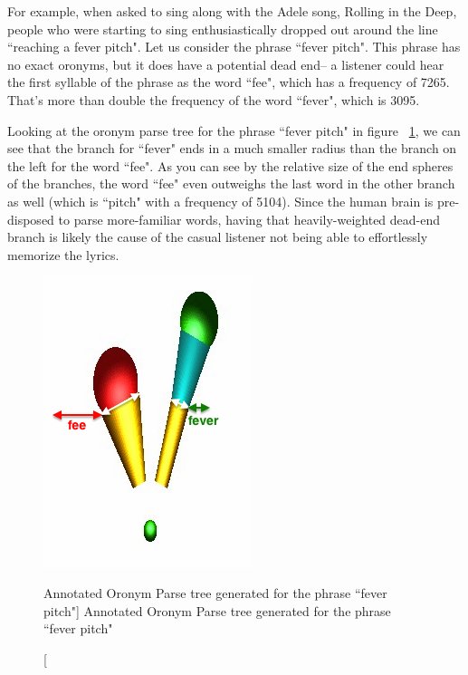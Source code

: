 For example, when asked to sing along with the Adele song, Rolling in the Deep, people who were starting to sing enthusiastically dropped out around the line ``reaching a fever pitch"\cite{frontPorchBandAdeleCover}.  Let us consider the phrase ``fever pitch".  This phrase has no exact oronyms, but it does have a potential dead end-- a listener could hear the first syllable of the phrase as the word ``fee", which has a frequency of 7265.  That's more than double the frequency of the word ``fever", which is 3095.  

Looking at the oronym parse tree for the phrase ``fever pitch" in figure ~\ref{fig:feverPitchOronymTree}, we can see that the branch for ``fever" ends in a much smaller radius than the branch on the left for the word ``fee".  As you can see by the relative size of the end spheres of the branches, the word ``fee" even outweighs the last word in the other branch as well (which is ``pitch" with a frequency of 5104). Since the human brain is pre-disposed to parse more-familiar words, having that heavily-weighted dead-end branch is likely the cause of the casual listener not being able to effortlessly memorize the lyrics.
\begin{figure}[h]
\includegraphics[width=.5\textwidth]{feverPitchTreeAnnotated.jpg}
\captionfonts
\caption[Annotated Oronym Parse tree  generated for the phrase ``fever pitch"]{ Annotated Oronym Parse tree generated for the phrase ``fever pitch" }
\label{fig:feverPitchOronymTree}
\end{figure}



